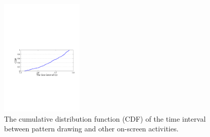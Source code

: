 \begin{figure}[!t]
    \centering
    \includegraphics[width=0.35\textwidth]{fig/time-interval.pdf}
    \caption{The cumulative distribution function (CDF) of the time interval between pattern drawing and other on-screen activities.}
    \label{fig:time-interval}
\end{figure}

